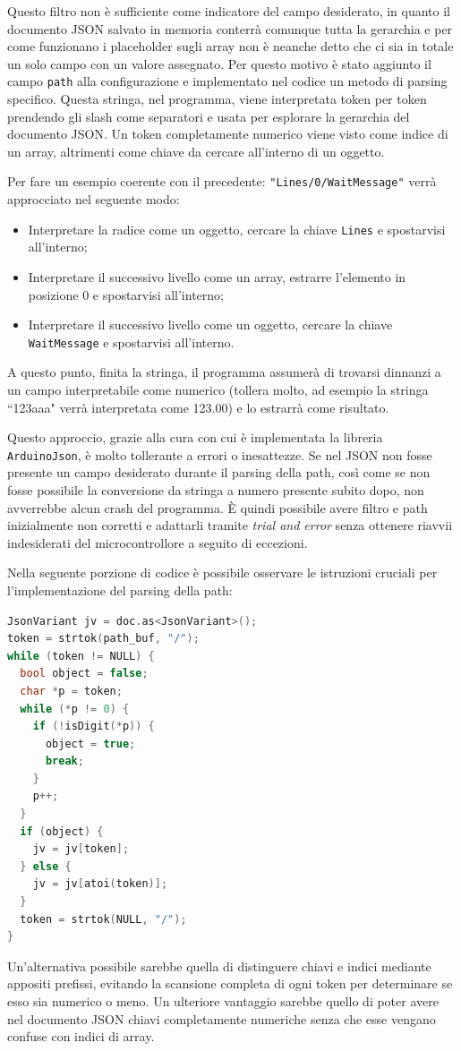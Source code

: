 \documentclass[12pt,a4paper]{report}
\begin{document}
Questo filtro non è sufficiente come indicatore del campo desiderato, in quanto il documento JSON salvato in memoria conterrà comunque
tutta la gerarchia e per come funzionano i placeholder sugli array non è neanche detto che ci sia in totale un solo campo con un valore
assegnato.
Per questo motivo è stato aggiunto il campo \texttt{path} alla configurazione e implementato nel codice un metodo di parsing specifico.
Questa stringa, nel programma, viene interpretata token per token prendendo gli slash come separatori e usata per esplorare
la gerarchia del documento JSON. Un token completamente numerico viene visto come indice di un array, altrimenti come chiave da
cercare all'interno di un oggetto.

Per fare un esempio coerente con il precedente: \texttt{"Lines/0/WaitMessage"} verrà approcciato nel seguente modo:
\begin{itemize}
  \item Interpretare la radice come un oggetto, cercare la chiave \texttt{Lines} e spostarvisi all'interno;
  \item Interpretare il successivo livello come un array, estrarre l'elemento in posizione 0 e spostarvisi all'interno;
  \item Interpretare il successivo livello come un oggetto, cercare la chiave \texttt{WaitMessage} e spostarvisi all'interno.
\end{itemize}
A questo punto, finita la stringa, il programma assumerà di trovarsi dinnanzi a un campo interpretabile come numerico (tollera molto,
ad esempio la stringa ``123aaa" verrà interpretata come 123.00) e lo estrarrà come risultato. %

Questo approccio, grazie alla cura con cui è implementata la libreria \texttt{ArduinoJson}, è molto tollerante a errori o inesattezze.
Se nel JSON non fosse presente un campo desiderato durante il parsing della path, così come se non fosse possibile la conversione
da stringa a numero presente subito dopo, non avverrebbe alcun crash del programma.
È quindi possibile avere filtro e path inizialmente non corretti e adattarli tramite \textit{trial and error} senza ottenere riavvii
indesiderati del microcontrollore a seguito di eccezioni.

Nella seguente porzione di codice è possibile osservare le istruzioni cruciali per l'implementazione del parsing della path:
\begin{lstlisting}[language=cpp]
JsonVariant jv = doc.as<JsonVariant>();
token = strtok(path_buf, "/");
while (token != NULL) {
  bool object = false;
  char *p = token;
  while (*p != 0) {
    if (!isDigit(*p)) {
      object = true;
      break;
    }
    p++;
  }
  if (object) {
    jv = jv[token];
  } else {
    jv = jv[atoi(token)];
  }
  token = strtok(NULL, "/");
}
\end{lstlisting}
Un'alternativa possibile sarebbe quella di distinguere chiavi e indici mediante appositi prefissi, evitando la scansione completa di ogni
token per determinare se esso sia numerico o meno. Un ulteriore vantaggio sarebbe quello di poter avere nel documento JSON
chiavi completamente numeriche senza che esse vengano confuse con indici di array.
\end{document}
